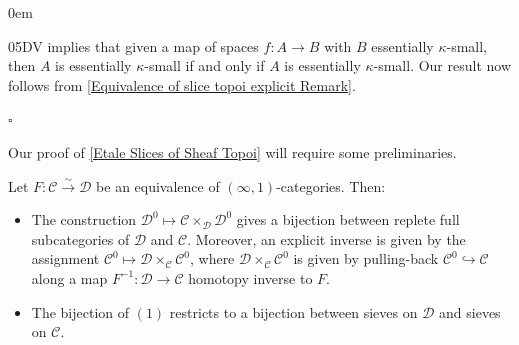 \documentclass[10pt]{article}
\newcommand{\C}{\mathcal C}
\newcommand{\cD}{\mathcal{D}}
\renewcommand{\qed}{\hfill$\square$}
\renewenvironment{proof}{\begin{addmargin}[1em]{0em}\begin{newproof}}{\end{newproof}\end{addmargin}\qed}
\theoremstyle{witharg}
\theoremstyle{witharg}
\theoremstyle{witharg2}
\begin{document}
\begin{proof}

 05DV implies that given a map of spaces $f:A\rightarrow B$ with $B$ essentially $\kappa$-small, then $A$ is essentially $\kappa$-small if and only if $A$ is essentially $\kappa$-small. Our result now follows from \ref{Equivalence of slice topoi explicit Remark}. 

\end{proof}





\noindent Our proof of \ref{Etale Slices of Sheaf Topoi} will require some preliminaries. 



\begin{lemma}{}\label{Sieves and Trivial Kan Fibrations}

    Let $F:\C\xrightarrow{\sim}\cD$ be an equivalence of $(\infty,1)$-categories. Then:

    \begin{itemize}
    
        \item [$(1)$] The construction $\cD^0\mapsto \C\times_\cD\cD^0$ gives a bijection between replete full subcategories of $\cD$ and $\C$. Moreover, an explicit inverse is given by the assignment $\C^0\mapsto \cD\times_\C\C^0$, where $\cD\times_\C\C^0$ is given by pulling-back $\C^0\hookrightarrow \C$ along a map $F^{-1}:\cD\rightarrow \C$ homotopy inverse to $F$. 

        \item [$(2)$] The bijection of $(1)$ restricts to a bijection between sieves on $\cD$ and sieves on $\C$. 
        
    \end{itemize}
    
    
    
    
\end{lemma}
\end{document}
